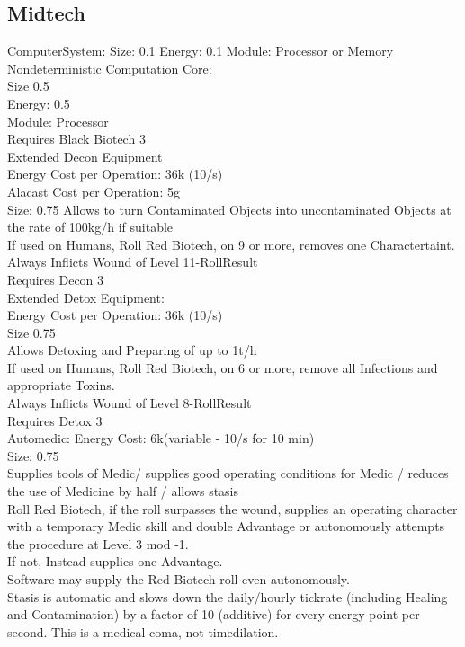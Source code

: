 \documentclass{article}
\begin{document}
    \subsection{Midtech}
    ComputerSystem:
    Size: 0.1
    Energy: 0.1
    Module: Processor or Memory\\
    \newline
    Nondeterministic Computation Core:\\
    Size 0.5\\
    Energy: 0.5\\
    Module: Processor\\
    Requires Black Biotech 3\\
    \newline
    Extended Decon Equipment\\
    Energy Cost per Operation: 36k (10/s)\\
    Alacast Cost per Operation: 5g\\
    Size: 0.75
    Allows to turn Contaminated Objects into uncontaminated Objects at the rate of 100kg/h if suitable\\
    If used on Humans, Roll Red Biotech, on 9 or more, removes one Charactertaint.\\
    Always Inflicts Wound of Level 11-RollResult\\
    Requires Decon 3\\
    \newline
    Extended Detox Equipment:\\
    Energy Cost per Operation: 36k (10/s)\\
    Size 0.75\\
    Allows Detoxing and Preparing of up to 1t/h\\
    If used on Humans, Roll Red Biotech, on 6 or more, remove all Infections and appropriate Toxins.\\
    Always Inflicts Wound of Level 8-RollResult\\
    Requires Detox 3\\
    \newline
    Automedic:
    Energy Cost: 6k(variable - 10/s for 10 min)\\
    Size: 0.75\\
    Supplies tools of Medic/ supplies good operating conditions for Medic / reduces the use of Medicine by half / allows stasis\\
    Roll Red Biotech, if the roll surpasses the wound, supplies an operating character with a temporary Medic skill and
    double Advantage or autonomously attempts the procedure at Level 3 mod -1.\\
    If not, Instead supplies one Advantage.\\
    Software may supply the Red Biotech roll even autonomously.\\
    Stasis is automatic and slows down the daily/hourly tickrate (including Healing and Contamination) by a factor of 10
    (additive) for every energy point per second. This is a medical coma, not timedilation.
\end{document}

